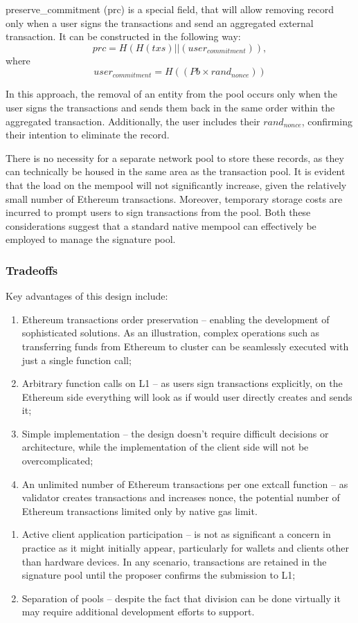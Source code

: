 preserve\_commitment (prc) is a special field, that will allow removing record only when a user 
signs the transactions and send an aggregated external transaction.
It can be constructed in the following way: 
\[ prc=H(H(txs)||(user_{commitment})), \] 
where \[ user_{commitment} = H((Pb \times rand_{nonce})) \]

In this approach, the removal of an entity from the pool occurs only when the user signs the 
transactions and sends them back in the same order within the aggregated transaction. 
Additionally, the user includes their \( rand_{nonce} \), confirming their intention to 
eliminate the record.

There is no necessity for a separate network pool to store these records, as they can 
technically be housed in the same area as the transaction pool. It is evident that the load on 
the mempool will not significantly increase, given the relatively small number of Ethereum 
transactions. Moreover, temporary storage costs are incurred to prompt users to sign 
transactions from the pool. Both these considerations suggest that a standard native mempool 
can effectively be employed to manage the signature pool.

\subsubsection{Tradeoffs}
Key advantages of this design include:
\begin{enumerate}
    \item Ethereum transactions order preservation -- enabling the development of sophisticated 
    solutions. As an illustration, complex operations such as transferring funds from Ethereum 
    to \nil cluster can be seamlessly executed with just a single function call;
    \item Arbitrary function calls on L1 -- as users sign transactions explicitly, on the 
    Ethereum side everything will look as if would user directly creates and sends it;
    \item Simple implementation -- the design doesn't require difficult decisions or 
    architecture, while the implementation of the client side will not be overcomplicated;
    \item An unlimited number of Ethereum transactions per one extcall function -- as validator 
    creates transactions and increases nonce, the potential number of Ethereum transactions 
    limited only by native gas limit.
\end{enumerate}
\begin{enumerate}
    \item Active client application participation -- is not as significant a concern in practice 
    as it might initially appear, particularly for wallets and clients other than hardware 
    devices. In any scenario, transactions are retained in the signature pool until the proposer 
    confirms the submission to L1;
    \item Separation of pools -- despite the fact that division can be done virtually it may require 
    additional development efforts to support.
\end{enumerate}